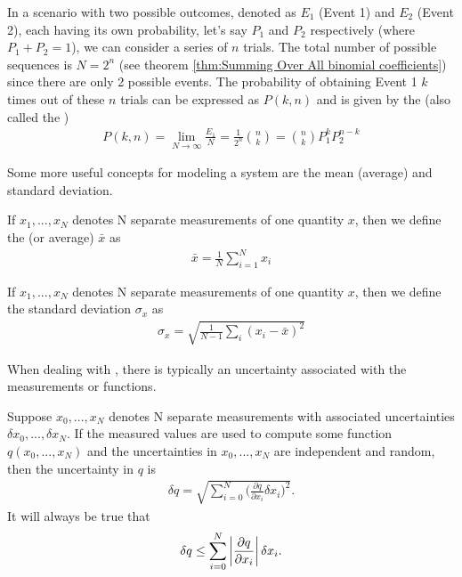 In a scenario with two possible outcomes, denoted as $E_1$ (Event 1) and $E_2$ (Event 2), each having its own probability, let's say $P_1$ and $P_2$ respectively (where $P_1 + P_2 = 1$), we can consider a series of $n$ trials. The total number of possible sequences is $N=2^n$ (see theorem \ref{thm:Summing Over All binomial coefficients}) since there are only 2 possible events. The probability of obtaining Event 1 $k$ times out of these $n$ trials can be expressed as $P(k, n)$ and is given by the  (also called the )
\begin{align}
P(k,n) = \lim_{N\rightarrow\infty}\frac{E_1}{N} = \frac{1}{2^n}{{n}\choose{k}} = {{n}\choose{k}}P_1^kP_2^{n-k}
\end{align}

Some more useful concepts for modeling a system are the mean (average) and standard deviation. 

\begin{defn}{1}
	If $x_1, ..., x_N$ denotes N separate measurements of one quantity $x$, then we define the  (or average) $\bar{x}$ as
	\begin{align}
		\bar{x} = \frac{1}{N}\sum_{i=1}^{N}x_i \label{mean equation}
	\end{align}
\end{defn}


\begin{defn}{1}
	If $x_1, ..., x_N$ denotes N separate measurements of one quantity $x$, then we define the standard deviation $\sigma_x$ as
	\begin{align}
		\sigma_x = \sqrt{\frac{1}{N-1}\sum_{i}(x_i-\bar{x})^2}
	\end{align}
\end{defn}

When dealing with , there is typically an uncertainty associated with the measurements or functions.

\begin{defn}{1}
	Suppose $x_0, ..., x_N$ denotes N separate measurements with associated uncertainties $\delta x_0, ..., \delta x_N$. If the measured values are used to compute some function $q(x_0, ..., x_N)$ and the uncertainties in $x_0, ..., x_N$ are independent and random, then the uncertainty in $q$ is
	\begin{align}
		\delta q = \sqrt{\sum_{i=0}^{N}\bigg(\frac{\partial q}{\partial x_i} \delta x_i\bigg)^2}.
	\end{align}
 It will always be true that 
 	\begin{align}
		\delta q \leq \sum_{i=0}^{N}\left| \frac{\partial q}{\partial x_i} \right| \delta x_i.
	\end{align}
\end{defn}

 
